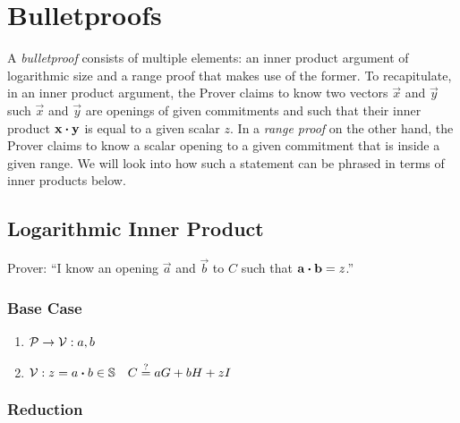 \section{Bulletproofs}

A \emph{bulletproof} consists of multiple elements:
an inner product argument of logarithmic size and a range proof that makes use of the former.
%
To recapitulate,
in an inner product argument,
the Prover claims to know two vectors $\vec{x}$ and $\vec{y}$
such $\vec{x}$ and $\vec{y}$ are openings of given commitments and
such that their inner product $\mathbf{x} \boldsymbol{\cdot} \mathbf{y}$ is equal to a given scalar $z$.
%
In a \emph{range proof} on the other hand,
the Prover claims to know a scalar opening to a given commitment that is inside a given range.
We will look into how such a statement can be phrased in terms of inner products below.

\subsection{Logarithmic Inner Product}

Prover: \enquote{I know an opening $\vec{a}$ and $\vec{b}$ to $C$ such that $\mathbf{a} \boldsymbol{\cdot} \mathbf{b} = z$.}


\subsubsection{Base Case}

\begin{enumerate}
    \item $\mathcal{P} \to \mathcal{V}: a, b$
    \item \hfill $\mathcal{V}: z = a \boldsymbol{\cdot} b \in \mathbb{S} \quad C \overset{?}{=} aG + bH + zI$
\end{enumerate}

\subsubsection{Reduction}

